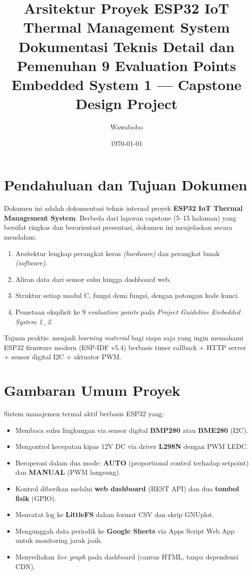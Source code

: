 \documentclass[11pt,a4paper]{article}
\title{\textbf{Arsitektur Proyek ESP32 IoT Thermal Management System}\\[0.4em]
\large Dokumentasi Teknis Detail dan Pemenuhan 9 Evaluation Points\\[0.3em]
\normalsize Embedded System 1 --- Capstone Design Project}
\author{Wawabobo}
\date{\today}
\begin{document}
\maketitle
\thispagestyle{empty}
\tableofcontents
\newpage

\section{Pendahuluan dan Tujuan Dokumen}

Dokumen ini adalah dokumentasi teknis internal proyek \textbf{ESP32 IoT Thermal Management System}. Berbeda dari laporan capstone (5--15 halaman) yang bersifat ringkas dan berorientasi presentasi, dokumen ini menjelaskan secara mendalam:

\begin{enumerate}[leftmargin=*]
    \item Arsitektur lengkap perangkat keras \emph{(hardware)} dan perangkat lunak \emph{(software)}.
    \item Aliran data dari sensor suhu hingga dashboard web.
    \item Struktur setiap modul C, fungsi demi fungsi, dengan potongan kode kunci.
    \item Pemetaan eksplisit ke 9 \emph{evaluation points} pada \emph{Project Guideline Embedded System 1\_2}.
\end{enumerate}

Tujuan praktis: menjadi \emph{learning material} bagi siapa saja yang ingin memahami ESP32 firmware modern (ESP-IDF v5.4) berbasis timer callback + HTTP server + sensor digital I2C + aktuator PWM.

\section{Gambaran Umum Proyek}

Sistem manajemen termal aktif berbasis ESP32 yang:
\begin{itemize}
    \item Membaca suhu lingkungan via sensor digital \textbf{BMP280} atau \textbf{BME280} (I2C).
    \item Mengontrol kecepatan kipas 12V DC via driver \textbf{L298N} dengan PWM LEDC.
    \item Beroperasi dalam dua mode: \textbf{AUTO} (proportional control terhadap setpoint) dan \textbf{MANUAL} (PWM langsung).
    \item Kontrol diberikan melalui \textbf{web dashboard} (REST API) dan dua \textbf{tombol fisik} (GPIO).
    \item Mencatat log ke \textbf{LittleFS} dalam format CSV dan skrip GNUplot.
    \item Mengunggah data periodik ke \textbf{Google Sheets} via Apps Script Web App untuk monitoring jarak jauh.
    \item Menyediakan \emph{live graph} pada dashboard (canvas HTML, tanpa dependensi CDN).
\end{itemize}
\end{document}
